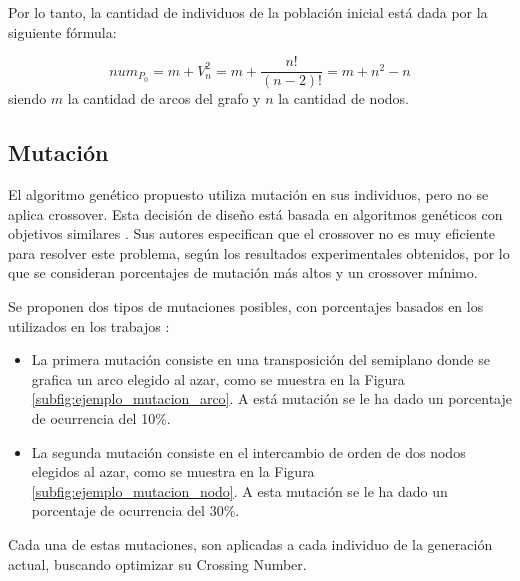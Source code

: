 	
	Por lo tanto, la cantidad de individuos de la población inicial está dada por la siguiente fórmula:
	
	$$num_{P_0} = m+V^2_n= m+ \frac{n!}{(n-2)!}=m+n^2-n $$siendo $m$ la cantidad de arcos del grafo y $n$ la cantidad de nodos.
	
	\subsection{Mutación}
	\label{subsec:mutacion}
	El algoritmo  genético propuesto utiliza   mutación en sus individuos, pero  no se aplica crossover. Esta decisión de  diseño está basada en 
	algoritmos genéticos  con  objetivos similares \cite{he2007parallelisation, eloranta2001timga}. Sus autores especifican que  el crossover no es muy eficiente para resolver este problema, según los resultados experimentales obtenidos, por lo que se consideran porcentajes de mutación más altos y un crossover mínimo.
	
	Se proponen dos tipos de mutaciones posibles, con porcentajes basados en los utilizados en los trabajos \cite{he2007parallelisation, eloranta2001timga}:
	
	\begin{itemize}
		\item La primera mutación consiste en una transposición del  semiplano donde se grafica  un arco elegido al azar, como se muestra en la Figura \ref{subfig:ejemplo_mutacion_arco}. A está mutación se le ha dado un porcentaje de ocurrencia del 10\%.
		\item La segunda mutación consiste en el intercambio de orden de dos nodos elegidos al azar, como se muestra en la Figura \ref{subfig:ejemplo_mutacion_nodo}. A esta mutación se le ha dado un porcentaje de ocurrencia del 30\%.
	\end{itemize}
	
	Cada una de estas mutaciones,  son aplicadas a  cada individuo de la generación actual, buscando optimizar su Crossing Number.
	
